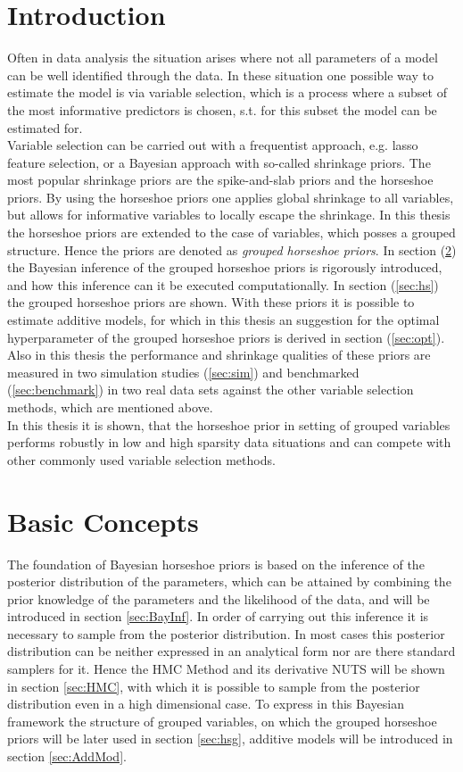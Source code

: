 \documentclass[12pt,letterpaper]{article}
\numberwithin{equation}{subsection}
\begin{document}
\section{Introduction}
Often in data analysis the situation arises where not all parameters of a model can be well identified through the data. In these situation one possible way to estimate the model is via variable selection, which is a process where a subset of the most informative predictors is chosen, s.t. for this subset the model can be estimated for. \\ 
Variable selection can be carried out with a frequentist approach, e.g. lasso feature selection, or a Bayesian approach with so-called shrinkage priors. The most popular shrinkage priors are the spike-and-slab priors and the horseshoe priors. By using the horseshoe priors one applies global shrinkage to all variables, but allows for informative variables to locally escape the shrinkage. In this thesis the horseshoe priors are extended to the case of variables, which posses a grouped structure. Hence the priors are denoted as \textit{grouped horseshoe priors}. In section (\ref{sec:basics}) the Bayesian inference of the grouped horseshoe priors is rigorously introduced, and how this inference can it be executed computationally. In section (\ref{sec:hs}) the grouped horseshoe priors are shown. With these priors it is possible to estimate additive models, for which in this thesis an suggestion for the optimal hyperparameter of the grouped horseshoe priors is derived in section (\ref{sec:opt}). Also in this thesis the performance and shrinkage qualities of these priors are measured in two simulation studies (\ref{sec:sim}) and benchmarked (\ref{sec:benchmark}) in two real data sets against the other variable selection methods, which are mentioned above. \\
In this thesis it is shown, that the horseshoe prior in setting of grouped variables performs robustly in low and high sparsity data situations and can compete with other commonly used variable selection methods.
\pagebreak

\section{Basic Concepts}
\label{sec:basics}
The foundation of Bayesian horseshoe priors is based on the inference of the posterior distribution of the parameters, which can be attained by combining the prior knowledge of the parameters and the likelihood of the data, and will be introduced in section \ref{sec:BayInf}. In order of carrying out this inference it is necessary to sample from the posterior distribution.
In most cases this posterior distribution can be neither expressed in an analytical form nor are there standard samplers for it. Hence the HMC Method and its derivative NUTS will be shown in section \ref{sec:HMC}, with which it is possible to sample from the posterior distribution even in a high dimensional case. To express in this Bayesian framework the structure of grouped variables, on which the grouped horseshoe priors will be later used in section \ref{sec:hsg},  additive models will be introduced in section \ref{sec:AddMod}.
\end{document}
